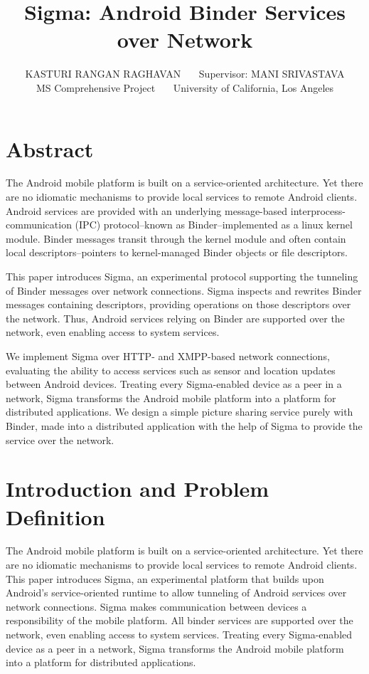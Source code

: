 \documentclass[prodmode]{acmlarge}
\title{Sigma: Android Binder Services over Network}
\author{KASTURI RANGAN RAGHAVAN~~~
Supervisor: MANI SRIVASTAVA\\
MS Comprehensive Project~~~
University of California, Los Angeles
}
\begin{document}
\pagestyle{plain}
\maketitle
\tableofcontents

\clearpage

\section{Abstract}
The Android mobile platform is built on a service-oriented architecture. Yet there are no idiomatic mechanisms to provide local services to remote Android clients. Android services are provided with an underlying message-based interprocess-communication (IPC) protocol--known as Binder--implemented as a linux kernel module. Binder messages transit through the kernel module and often contain local descriptors--pointers to kernel-managed Binder objects or file descriptors.

This paper introduces Sigma, an experimental protocol supporting the tunneling of Binder messages over network connections. Sigma inspects and rewrites Binder messages containing descriptors, providing operations on those descriptors over the network. Thus, Android services relying on Binder are supported over the network, even enabling access to system services.

We implement Sigma over HTTP- and XMPP-based network connections, evaluating the ability to access services such as sensor and location updates between Android devices. Treating every Sigma-enabled device as a peer in a network, Sigma transforms the Android mobile platform into a platform for distributed applications. We design a simple picture sharing service purely with Binder, made into a distributed application with the help of Sigma to provide the service over the network.

\section{Introduction and Problem Definition}

The Android mobile platform is built on a service-oriented architecture. Yet there are no idiomatic mechanisms to provide local services to remote Android clients. This paper introduces Sigma, an experimental platform that builds upon Android's service-oriented runtime to allow tunneling of Android services over network connections. Sigma makes communication between devices a responsibility of the mobile platform. All binder services are supported over the network, even enabling access to system services. Treating every Sigma-enabled device as a peer in a network, Sigma transforms the Android mobile platform into a platform for distributed applications.
\end{document}
